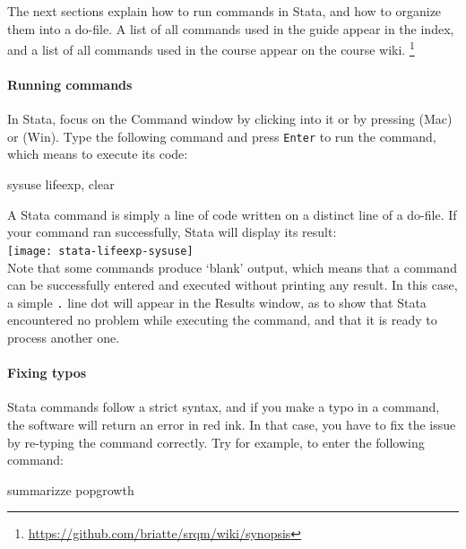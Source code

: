 The next sections explain how to run commands in Stata, and how to organize them into a do-file. A list of all commands used in the guide appear in the index, and a list of all commands used in the course appear on the course wiki.%
	\footnote{\url{https://github.com/briatte/srqm/wiki/synopsis}}%

	\paragraph{Running commands}
  
	In Stata, focus on the Command window by clicking into it or by pressing  (Mac) or (Win). Type the following command and press \texttt{Enter} to run the command, which means to execute its code:%
		
	\begin{docspec}%
		\label{lifeexp}%
		sysuse lifeexp, clear
	\end{docspec}
		
	A Stata command is simply a line of code written on a distinct line of a do-file. If your command ran successfully, Stata will display its result:\\[1em]
		
		\texttt{[image: stata-lifeexp-sysuse]}\\[1em]

	Note that some commands produce `blank' output, which means that a command can be successfully entered and executed without printing any result. In this case, a simple \texttt{.} line dot will appear in the Results window, as to show that Stata encountered no problem while executing the command, and that it is ready to process another one.%

	\paragraph{Fixing typos}%

	Stata commands follow a strict syntax, and if you make a typo in a command, the software will return an error in red ink. In that case, you have to fix the issue by re-typing the command correctly. Try for example, to enter the following command:%
		
		\begin{docspec}
			summarizze popgrowth
		\end{docspec}%
		
